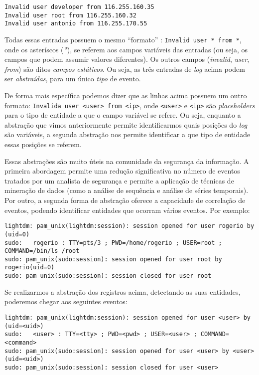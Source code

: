 \documentclass[
	12pt,				%
	openright,			%
	twoside,			%
	a4paper,			%
	english,			%
	spanish,			%
	brazil,				%
	]{abntex2}
\begin{document}
\begin{verbatim}
Invalid user developer from 116.255.160.35
Invalid user root from 116.255.160.32
Invalid user antonio from 116.255.170.55
\end{verbatim}

Todas essas entradas possuem o mesmo ``formato'' : \verb|Invalid user * from *|, onde os asteríscos (\emph{*}), se referem aos campos variáveis das entradas (ou seja, os campos que podem assumir valores diferentes). Os outros campos (\emph{invalid}, \emph{user}, \emph{from}) são ditos \emph{campos estáticos}. Ou seja, as três entradas de \emph{log} acima podem ser \emph{abstraídas}, para um único \emph{tipo} de evento.

De forma mais específica podemos dizer que as linhas acima possuem um outro formato: \verb|Invalida user <user> from <ip>|, onde \verb|<user>| e \verb|<ip>| são \emph{placeholders} para o tipo de entidade a que o campo variável se refere. Ou seja, enquanto a abstração que vimos anteriormente permite identificarmos quais posições do \emph{log} são variáveis, a segunda abstração nos permite identificar a que tipo de entidade essas posições se referem.

Essas abstrações são muito úteis na comunidade da segurança da informação. A primeira abordagem permite uma redução significativa no número de eventos tratados por um analista de segurança e permite a aplicação de técnicas de mineração de dados (como a análise de sequência e análise de séries temporais). Por outro, a segunda forma de abstração oferece a capacidade de correlação de eventos, podendo identificar entidades que ocorram vários eventos. Por exemplo:

{\small
\begin{verbatim}
lightdm: pam_unix(lightdm:session): session opened for user rogerio by (uid=0)
sudo:   rogerio : TTY=pts/3 ; PWD=/home/rogerio ; USER=root ; COMMAND=/bin/ls /root
sudo: pam_unix(sudo:session): session opened for user root by rogerio(uid=0)
sudo: pam_unix(sudo:session): session closed for user root
\end{verbatim}
}

Se realizarmos a abstração dos registros acima, detectando as suas entidades, poderemos chegar aos seguintes eventos:

{\small
\begin{verbatim}
lightdm: pam_unix(lightdm:session): session opened for user <user> by (uid=<uid>)
sudo:   <user> : TTY=<tty> ; PWD=<pwd> ; USER=<user> ; COMMAND=<command>
sudo: pam_unix(sudo:session): session opened for user <user> by <user>(uid=<uid>)
sudo: pam_unix(sudo:session): session closed for user <user>
\end{verbatim}
}
\end{document}
